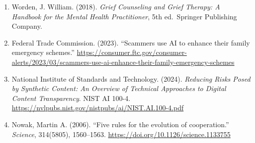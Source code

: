 \documentclass[
  11pt,
  letterpaper,
]{article}
\begin{document}
\begin{enumerate}
  Government of South Africa. (1994). \emph{White Paper on
  Reconstruction and Development}.
\item
  Worden, J. William. (2018). \emph{Grief Counseling and Grief Therapy:
  A Handbook for the Mental Health Practitioner}, 5th ed.~Springer
  Publishing Company.
\item
  Federal Trade Commission. (2023). ``Scammers use AI to enhance their
  family emergency schemes.''
  \url{https://consumer.ftc.gov/consumer-alerts/2023/03/scammers-use-ai-enhance-their-family-emergency-schemes}
\item
  National Institute of Standards and Technology. (2024). \emph{Reducing
  Risks Posed by Synthetic Content: An Overview of Technical Approaches
  to Digital Content Transparency}. NIST AI 100-4.
  \url{https://nvlpubs.nist.gov/nistpubs/ai/NIST.AI.100-4.pdf}
\item
  Nowak, Martin A. (2006). ``Five rules for the evolution of
  cooperation.'' \emph{Science}, 314(5805), 1560--1563.
  \url{https://doi.org/10.1126/science.1133755}
\end{enumerate}
\end{document}
